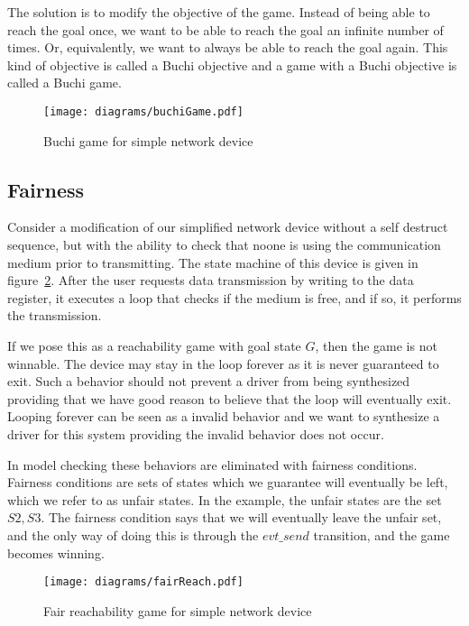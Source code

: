 The solution is to modify the objective of the game. Instead of being able to reach the goal once, we want to be able to reach the goal an infinite number of times. Or, equivalently, we want to always be able to reach the goal again. This kind of objective is called a Buchi objective and a game with a Buchi objective is called a Buchi game. 

\begin{figure}
\centering
\texttt{[image: diagrams/buchiGame.pdf]}
\caption{Buchi game for simple network device}
\label{fig:buchi}
\end{figure}

\subsection{Fairness}

Consider a modification of our simplified network device without a self destruct sequence, but with the ability to check that noone is using the communication medium prior to transmitting. The state machine of this device is given in figure~\ref{fig:fair}. After the user requests data transmission by writing to the data register, it executes a loop that checks if the medium is free, and if so, it performs the transmission. 

If we pose this as a reachability game with goal state $G$, then the game is not winnable. The device may stay in the loop forever as it is never guaranteed to exit. Such a behavior should not prevent a driver from being synthesized providing that we have good reason to believe that the loop will eventually exit. Looping forever can be seen as a invalid behavior and we want to synthesize a driver for this system providing the invalid behavior does not occur. 

In model checking these behaviors are eliminated with fairness conditions. Fairness conditions are sets of states which we guarantee will eventually be left, which we refer to as unfair states. In the example, the unfair states are the set ${S2, S3}$. The fairness condition says that we will eventually leave the unfair set, and the only way of doing this is through the $evt\_send$ transition, and the game becomes winning.

\begin{figure}[t]
\centering
\texttt{[image: diagrams/fairReach.pdf]}
\caption{Fair reachability game for simple network device}
\label{fig:fair}
\end{figure}

